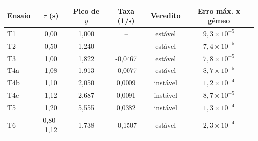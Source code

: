 \begin{tabular}{lccccc}
\hline
Ensaio & $\tau$ (s) & Pico de $y$ & Taxa (1/s) & Veredito & Erro máx. x gêmeo \\
\hline
T1 & 0{,}00 & 1{,}000 & -- & estável & $9{,}3 \times 10^{-5}$ \\
T2 & 0{,}50 & 1{,}240 & -- & estável & $7{,}4 \times 10^{-5}$ \\
T3 & 1{,}00 & 1{,}822 & -0{,}0467 & estável & $7{,}8 \times 10^{-5}$ \\
T4a & 1{,}08 & 1{,}913 & -0{,}0077 & estável & $8{,}7 \times 10^{-5}$ \\
T4b & 1{,}10 & 2{,}050 & 0{,}0009 & instável & $1{,}2 \times 10^{-4}$ \\
T4c & 1{,}12 & 2{,}687 & 0{,}0091 & instável & $8{,}7 \times 10^{-5}$ \\
T5 & 1{,}20 & 5{,}555 & 0{,}0382 & instável & $1{,}3 \times 10^{-4}$ \\
T6 & 0{,}80--1{,}12 & 1{,}738 & -0{,}1507 & estável & $2{,}3 \times 10^{-4}$ \\
\hline
\end{tabular}
